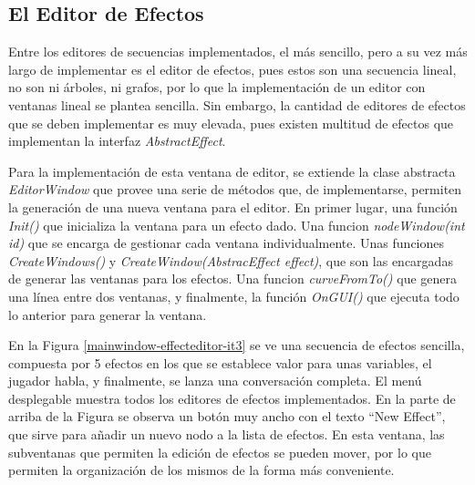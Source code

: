 \subsection{El Editor de Efectos}

Entre los editores de secuencias implementados, el más sencillo, pero a su vez más largo de implementar es el editor de efectos, pues estos son una secuencia lineal, no son ni árboles, ni grafos, por lo que la implementación de un editor con ventanas lineal se plantea sencilla. Sin embargo, la cantidad de editores de efectos que se deben implementar es muy elevada, pues existen multitud de efectos que implementan la interfaz \textit{AbstractEffect}.

Para la implementación de esta ventana de editor, se extiende la clase abstracta \textit{EditorWindow} que provee una serie de métodos que, de implementarse, permiten la generación de una nueva ventana para el editor. En primer lugar, una función \textit{Init()} que inicializa la ventana para un efecto dado. Una funcion \textit{nodeWindow(int id)} que se encarga de gestionar cada ventana individualmente. Unas funciones \textit{CreateWindows()} y \textit{CreateWindow(AbstracEffect effect)}, que son las encargadas de generar las ventanas para los efectos. Una funcion \textit{curveFromTo()} que genera una línea entre dos ventanas, y finalmente, la función \textit{OnGUI()} que ejecuta todo lo anterior para generar la ventana.

En la Figura \ref{mainwindow-effecteditor-it3} se ve una secuencia de efectos sencilla, compuesta por 5 efectos en los que se establece valor para unas variables, el jugador habla, y finalmente, se lanza una conversación completa. El menú desplegable muestra todos los editores de efectos implementados. En la parte de arriba de la Figura se observa un botón muy ancho con el texto ``New Effect'', que sirve para añadir un nuevo nodo a la lista de efectos. En esta ventana, las subventanas que permiten la edición de efectos se pueden mover, por lo que permiten la organización de los mismos de la forma más conveniente.

